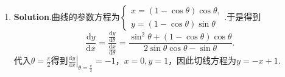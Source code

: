 \documentclass[../Main.tex]{subfiles}
\begin{document}
\begin{enumerate}
    \item \textbf{Solution}.曲线的参数方程为$\begin{cases}
                  x=(1-\cos\theta)\cos\theta, \\
                  y=(1-\cos\theta)\sin\theta
              \end{cases}$.于是得到
          \[
              \frac{\mathrm{d}y}{\mathrm{d}x}=\frac{\frac{\mathrm{d}y}{\mathrm{d}\theta}}{\frac{\mathrm{d}x}{\mathrm{d}\theta}}
              =\frac{\sin^{2}\theta+(1-\cos\theta)\cos\theta}{2\sin\theta\cos\theta-\sin\theta}
              .
          \]
          代入$\theta=\frac{\pi}{2}$得到$\left.\frac{\mathrm{d}y}{\mathrm{d}x}\right|
              _{\theta=\frac{\pi}{2}}=-1$，$x=0,y=1$，因此切线方程为$y=-x+1$.
\end{enumerate}
\end{document}
